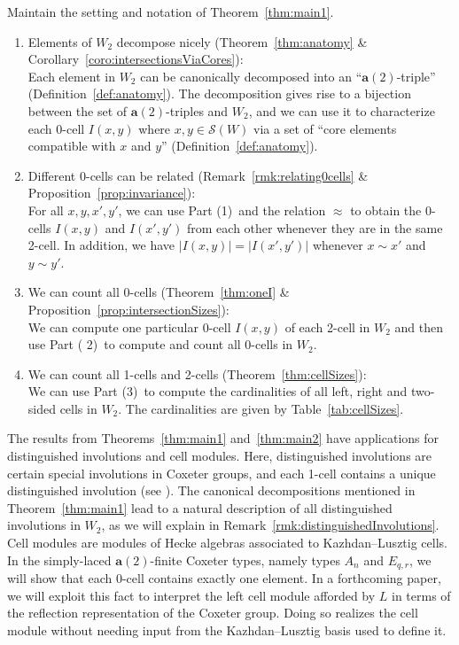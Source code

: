 \documentclass[ALCO,Unicode,published]{cedram}
\newcommand{\la}{\mathbf{a}}
\newcommand{\sw}{\mathcal{S}(W)}
\newcommand{\tul}{\textup{(}}
\newcommand{\tur}{\textup{)}}
\newcommand{\abs}[1]{\lvert #1 \rvert}
\begin{document}
\begin{thm}
    \label{thm:main2}
    Maintain the setting and notation of Theorem~\ref{thm:main1}.
    \begin{enumerate}
    \item \textup{Elements of $W_2$ decompose nicely (Theorem~\ref{thm:anatomy} \&
         Corollary~\ref{coro:intersectionsViaCores}):}\\ Each element in $W_2$ can be canonically
         decomposed into an ``$\la(2)$-triple'' (Definition~\ref{def:anatomy}). The decomposition
         gives rise to a bijection between the set of $\la(2)$-triples and $W_2$, and we can use
         it to characterize each 0-cell $I(x,y)$ where $x,y\in\sw$ via a set of ``core elements
         compatible with $x$ and $y$'' (Definition~\ref{def:anatomy}).
    \item \textup{Different 0-cells can be related (Remark~\ref{rmk:relating0cells} \&
         Proposition~\ref{prop:invariance}):}\\ For all $x,y,x',y'$, we can use Part \tul 1\tur\ and the
         relation $\approx$ to obtain the 0-cells $I(x,y)$ and $I(x',y')$ from each other
         whenever they are in the same 2-cell. In addition, we have
         $\abs{I(x,y)}=\abs{I(x',y')}$ whenever $x\sim x'$ and $y\sim y'$.
    \item \textup{We can count all 0-cells (Theorem~\ref{thm:oneI} \& Proposition~\ref{prop:intersectionSizes}):}\\ We
         can compute one particular 0-cell $I(x,y)$ of each 2-cell in $W_2$ and then use Part \tul
         2\tur\, to compute and count all 0-cells in $W_2$. 
    \item \textup{We can count all 1-cells and 2-cells (Theorem~\ref{thm:cellSizes}):}\\ We can use Part
         \tul 3\tur\, to compute the cardinalities of all left, right and two-sided cells in $W_2$.
         The cardinalities are given by Table~\ref{tab:cellSizes}.
    \end{enumerate}
\end{thm} 
\noindent 




The results from Theorems~\ref{thm:main1} and~\ref{thm:main2} have applications for {distinguished
involutions} and {cell modules}.  Here, distinguished involutions are certain special involutions in
Coxeter groups, and each 1-cell contains a unique distinguished involution (see \cite[Chapter
14]{LusztigHecke}).  The canonical decompositions mentioned in Theorem~\ref{thm:main1} lead to a natural
description of all distinguished involutions in $W_2$, as we will explain in
Remark~\ref{rmk:distinguishedInvolutions}. Cell modules are modules of Hecke algebras associated to
Kazhdan--Lusztig cells. In the simply-laced $\la(2)$-finite Coxeter types, namely types $A_n$ and
$E_{q,r}$, we will show that each 0-cell contains exactly one element. In a forthcoming paper, we
will exploit this fact to interpret the left cell module afforded by $L$ in terms of the {reflection
representation} of the Coxeter group. Doing so realizes the cell module without needing input from
the Kazhdan--Lusztig basis used to define it. 
\end{document}
